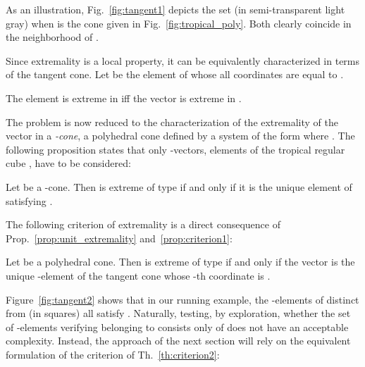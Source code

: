 \documentclass[proceedings]{stacs}
\begin{document}
As an illustration, Fig.~\ref{fig:tangent1} depicts the set  (in semi-transparent light gray) when  is the cone given in Fig.~\ref{fig:tropical_poly}. Both clearly coincide in the neighborhood of .


Since extremality is a local property, it can be equivalently
characterized in terms of the tangent cone. Let  be the element of  whose all coordinates are equal to .
\begin{proposition}\label{prop:unit_extremality}
The element 
is extreme in  iff the vector  is extreme in 
.
\end{proposition}
The problem is now reduced to the characterization of the extremality of the vector  in a \emph{-cone}, \ie{} a polyhedral cone defined by a system of the form  where . The following proposition states that only -vectors, \ie{} elements of the tropical regular cube , have to be considered:
\begin{proposition}\label{prop:criterion1}
Let  be a -cone. 
Then  is extreme of type  if and only if it is the unique element  of  satisfying .
\end{proposition}

The following criterion of extremality is a direct consequence of Prop.~\ref{prop:unit_extremality} and~\ref{prop:criterion1}:
\begin{theorem}\label{th:criterion2}
Let  be a polyhedral cone. Then  is extreme of type  if and only if the vector  is the unique -element of the tangent cone  whose -th coordinate is .
\end{theorem}


Figure~\ref{fig:tangent2} shows that in our running example, the -elements of  distinct from  (in squares) all satisfy .
Naturally, testing, by exploration, whether the set of  -elements  verifying  belonging to  
consists only of  
does not have an acceptable complexity. Instead, the approach of the next section will rely on the equivalent formulation of the criterion of Th.~\ref{th:criterion2}:
\end{document}
